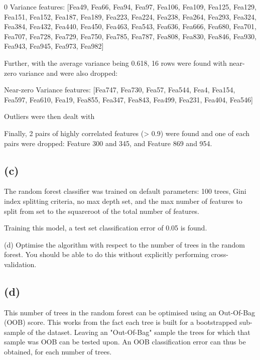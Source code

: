 \documentclass[12pt]{report} %
\begin{document}
\begin{center}
    0 Variance features: [Fea49, Fea66, Fea94, Fea97, Fea106, Fea109, Fea125, Fea129, Fea151, Fea152, Fea187, Fea189, Fea223, Fea224, Fea238, Fea264, Fea293, Fea324, Fea384, Fea432, Fea440, Fea450, Fea463, Fea543, Fea636, Fea666, Fea680, Fea701, Fea707, Fea728, Fea729, Fea750, Fea785, Fea787, Fea808, Fea830, Fea846, Fea930, Fea943, Fea945, Fea973, Fea982]
\end{center}

Further, with the average variance being 0.618, 16 rows were found with near-zero variance and were also dropped:

\begin{center}
    Near-zero Variance features: [Fea747, Fea730, Fea57, Fea544, Fea4, Fea154, Fea597, Fea610, Fea19, Fea855, Fea347, Fea843, Fea499, Fea231, Fea404, Fea546]
\end{center}

Outliers were then dealt with

Finally, 2 pairs of highly correlated features (> 0.9) were found and one of each pairs were dropped: Feature 300 and 345, and Feature 869 and 954.


\subsection*{(c)}

The random forest classifier was trained on default parameters: 100 trees, Gini index splitting criteria, no max depth set, and the max number of features to split from set to the squareroot of the total number of features.  

Training this model, a test set classification error of 0.05 is found.

(d) Optimise the algorithm with respect to the number of trees in the random forest. You should be able to do this without explicitly performing cross-validation.

\subsection*{(d)}

This number of trees in the random forest can be optimised using an Out-Of-Bag (OOB) score. This works from the fact each tree is built for a bootstrapped sub-sample of the dataset. Leaving an "Out-Of-Bag" sample the trees for which that sample was OOB can be tested upon. An OOB classification error can thus be obtained, for each number of trees\cite[p. 345]{james2013introduction}.  
\end{document}
